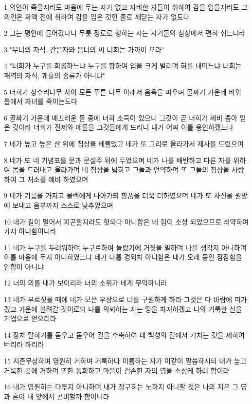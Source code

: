 \par 1 의인이 죽을지라도 마음에 두는 자가 없고 자비한 자들이 취하여 감을 입을지라도 그 의인은 화액 전에 취하여 감을 입은 것인 줄로 깨닫는 자가 없도다
\par 2 그는 평안에 들어갔나니 무릇 정로로 행하는 자는 자기들의 침상에서 편히 쉬느니라
\par 3 "무녀의 자식, 간음자와 음녀의 씨 너희는 가까이 오라"
\par 4 "너희가 누구를 희롱하느냐 누구를 향하여 입을 크게 벌리며 혀를 내미느냐 너희는 패역의 자식, 궤휼의 종류가 아니냐"
\par 5 너희가 상수리나무 사이 모든 푸른 나무 아래서 음욕을 피우며 골짜기 가운데 바위 틈에서 자녀를 죽이는도다
\par 6 골짜기 가운데 매끄러운 돌 중에 너희 소득이 있으니 그것이 곧 너희가 제비 뽑아 얻은 것이라 너희가 전제와 예물을 그것들에게 드리니 내가 어찌 이를 용인하겠느냐
\par 7 네가 높고 높은 산 위에 침상을 베풀었고 네가 또 그리로 올라가서 제사를 드렸으며
\par 8 네가 또 네 기념표를 문과 문설주 뒤에 두었으며 네가 나를 배반하고 다른 자를 위하여 몸을 드러내고 올라가며 네 침상을 넓히고 그들과 언약하며 또 그들의 침상을 사랑하여 그 처소를 예비 하였으며
\par 9 네가 기름을 가지고 몰렉에게 나아가되 향품을 더욱 더하였으며 네가 또 사신을 원방에 보내고 음부까지 스스로 낮추었으며
\par 10 네가 길이 멀어서 피곤할지라도 헛되다 아니함은 네 힘이 소성 되었으므로 쇠약하여 가지 아니함이니라
\par 11 네가 누구를 두려워하며 누구로하여 놀랐기에 거짓을 말하며 나를 생각지 아니하며 이를 마음에 두지 아니하였느냐 네가 나를 경외치 아니함은 내가 오래 동안 잠잠함을 인함이 아니냐
\par 12 너의 의를 내가 보이리라 너의 소위가 네게 무익하니라
\par 13 네가 부르짖을 때에 네가 모은 우상으로 너를 구원하게 하라 그것은 다 바람에 떠가겠고 기운에 불려갈 것이로되 나를 의뢰하는 자는 땅을 차지하겠고 나의 거룩한 산을 기업으로 얻으리라
\par 14 장차 말하기를 돋우고 돋우어 길을 수축하여 내 백성의 길에서 거치는 것을 제하여 버리라 하리라
\par 15 지존무상하며 영원히 거하며 거룩하다 이름하는 자가 이같이 말씀하시되 내가 높고 거룩한 곳에 거하며 또한 통회하고 마음이 겸손한 자의 영을 소성케 하려 함이라
\par 16 내가 영원히는 다투지 아니하며 내가 장구히는 노하지 아니할 것은 나의 지은 그 영과 혼이 내 앞에서 곤비할까 함이니라
